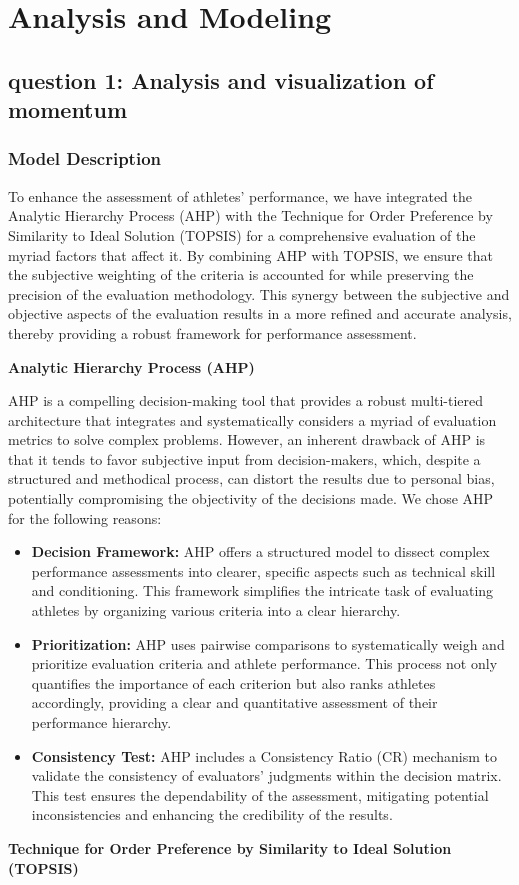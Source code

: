 \section{Analysis and Modeling}

\subsection{question 1: Analysis and visualization of momentum}
\subsubsection{Model Description}
To enhance the assessment of athletes’ performance, we have integrated the Analytic Hierarchy Process (AHP) with the Technique for Order Preference by Similarity to Ideal Solution (TOPSIS) for a comprehensive evaluation of the myriad factors that affect it. By combining AHP with TOPSIS, we ensure that the subjective weighting of the criteria is accounted for while preserving the precision of the evaluation methodology. This synergy between the subjective and objective aspects of the evaluation results in a more refined and accurate analysis, thereby providing a robust framework for performance assessment.\par
\textbf{Analytic Hierarchy Process (AHP)}

AHP is a compelling decision-making tool that provides a robust multi-tiered architecture that integrates and systematically considers a myriad of evaluation metrics to solve complex problems. However, an inherent drawback of AHP is that it tends to favor subjective input from decision-makers, which, despite a structured and methodical process, can distort the results due to personal bias, potentially compromising the objectivity of the decisions made. We chose AHP for the following reasons:
\begin{itemize}
    \item \textbf{Decision Framework:} AHP offers a structured model to dissect complex performance assessments into clearer, specific aspects such as technical skill and conditioning. This framework simplifies the intricate task of evaluating athletes by organizing various criteria into a clear hierarchy.

    \item \textbf{Prioritization:} AHP uses pairwise comparisons to systematically weigh and prioritize evaluation criteria and athlete performance. This process not only quantifies the importance of each criterion but also ranks athletes accordingly, providing a clear and quantitative assessment of their performance hierarchy.

     \item \textbf{Consistency Test:} AHP includes a Consistency Ratio (CR) mechanism to validate the consistency of evaluators' judgments within the decision matrix. This test ensures the dependability of the assessment, mitigating potential inconsistencies and enhancing the credibility of the results.
\end{itemize}\par
\textbf{Technique for Order Preference by Similarity to Ideal Solution (TOPSIS)}

